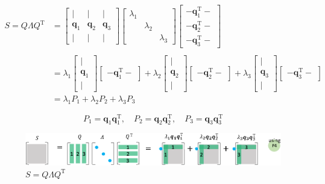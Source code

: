 \documentclass[letterpaper]{article}
\DeclareRobustCommand\transp{^{\mathrm{T}}}
\begin{document}
\begin{align*}
  S = Q \Lambda Q\transp
&= \begin{bmatrix}
    | & | & |\\
    \bm{q}_1 & \bm{q}_2 & \bm{q}_3\\
    | & | & |
  \end{bmatrix}
  \begin{bmatrix}
    \lambda_1 \\
           & \lambda_2 & \\
           & & \lambda_3
  \end{bmatrix}
  \begin{bmatrix}
  - \bm{q}_1\transp -\\
  - \bm{q}_2\transp -\\
  - \bm{q}_3\transp -
  \end{bmatrix}\\
  \\
  &=
  \lambda_1 \begin{bmatrix}
    |\\
    \bm{q}_1\\
    |
  \end{bmatrix}
  \begin{bmatrix}
    - \bm{q}_1\transp - 
  \end{bmatrix}
  +
  \lambda_2 \begin{bmatrix}
  |\\
  \bm{q}_2\\
  |
  \end{bmatrix}
  \begin{bmatrix}
  - \bm{q}_2\transp -
  \end{bmatrix} 
  +
  \lambda_3 \begin{bmatrix}
    |\\
    \bm{q}_3 \\
    |
  \end{bmatrix}
  \begin{bmatrix}
    - \bm{q}_3\transp -
  \end{bmatrix} \\
&= \lambda_1 P_1 + \lambda_2 P_2 + \lambda_3 P_3
\end{align*}

\begin{equation*}
  P_1=\bm{q}_1 \bm{q}_1\transp, \quad P_2=\bm{q}_2 \bm{q}_2\transp, \quad P_3=\bm{q}_3 \bm{q}_3\transp
\end{equation*}


\begin{figure}[H]
  \includegraphics[keepaspectratio, width=\linewidth]{EVD-j.eps}
  \caption{$S=Q \Lambda Q\transp$}
\end{figure}
\end{document}
